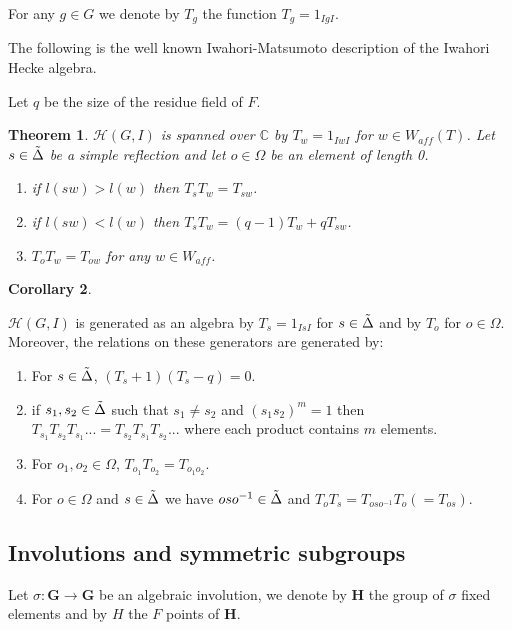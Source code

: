 \documentclass[12pt]{article}
\newcommand{\<}{\langle}
\renewcommand{\>}{\rangle}
\theoremstyle{plain}
\newtheorem{theorem}{Theorem}[section] %
\theoremstyle{definition}
\newtheorem{cor}[theorem]{Corollary}
\begin{document}
For any $g\in G$ we denote by $T_g$ the function $T_g=1_{IgI}$.

The following is the well known Iwahori-Matsumoto description of the Iwahori Hecke algebra.

Let $q$ be the size of the residue field of $F$.

\begin{theorem}\label{2.20}
    $\mathcal{H}(G,I)$ is spanned over $\mathbb{C}$ by $T_w=1_{IwI}$ for $w\in W_{aff}(T)$. Let $s\in \Tilde{\Delta}$ be a simple reflection and let $o\in \Omega$ be an element of length 0.
    \begin{enumerate}
        \item if $l(sw)>l(w)$ then $T_sT_w=T_{sw}$.
        \item if $l(sw)<l(w)$ then $T_sT_w=(q-1)T_w+qT_{sw}$.
        \item $T_{o}T_w=T_{ow}$ for any $w\in W_{aff}$.
    \end{enumerate}
    \end{theorem}
    \begin{cor}\label{2.21}
    
    $\mathcal{H}(G,I)$ is generated as an algebra by $T_s=1_{IsI}$ for $s\in \Tilde{\Delta}$ and by $T_o$ for $o\in \Omega$. Moreover, the relations on these generators are generated by:
        \begin{enumerate}
            \item For $s\in \Tilde{\Delta}$, $(T_s+1)(T_s-q)=0$.
            \item if $s_1,s_2\in\Tilde{\Delta}$ such that $s_1\neq s_2$ and $(s_1s_2)^m=1$ then $T_{s_1}T_{s_2}T_{s_1}...=T_{s_2}T_{s_1}T_{s_2}...$  where each product contains $m$ elements.
            \item For $o_1,o_2\in \Omega$, $T_{o_1}T_{o_2}=T_{o_1o_2}$.
            \item For $o\in \Omega$ and $s\in\Tilde{\Delta}$ we have $oso^{-1}\in\Tilde{\Delta}$ and $T_oT_s=T_{oso^{-1}}T_o (=T_{os})$.
         \end{enumerate}
    \end{cor}


\subsection{Involutions and symmetric subgroups}

Let $\sigma:\mathbf{G}\rightarrow\mathbf{G}$ be an algebraic involution, we denote by $\mathbf{H}$ the group of $\sigma$ fixed elements and by $H$ the $F$ points of $\mathbf{H}$.
\end{document}
